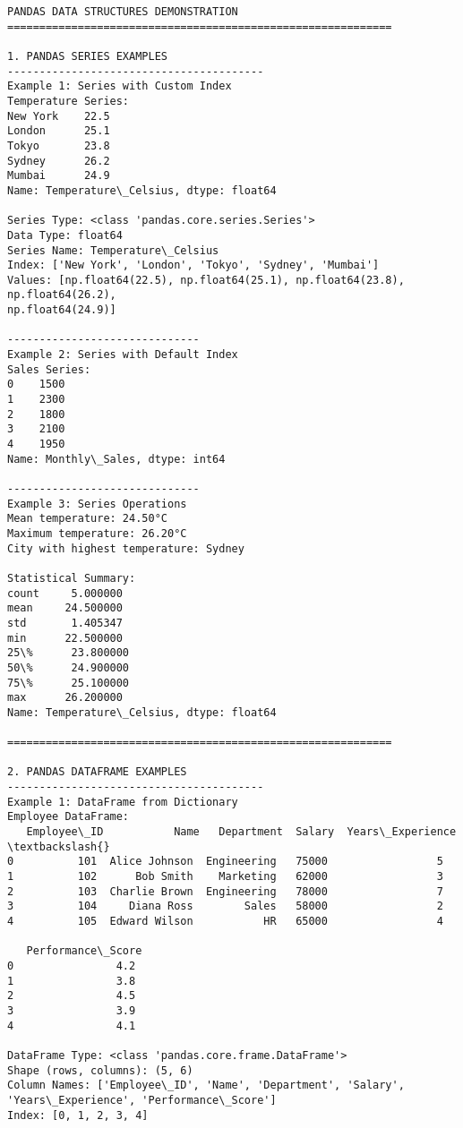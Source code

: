 \documentclass[11pt]{article}
\begin{document}
    \begin{Verbatim}[commandchars=\\\{\}]
PANDAS DATA STRUCTURES DEMONSTRATION
============================================================

1. PANDAS SERIES EXAMPLES
----------------------------------------
Example 1: Series with Custom Index
Temperature Series:
New York    22.5
London      25.1
Tokyo       23.8
Sydney      26.2
Mumbai      24.9
Name: Temperature\_Celsius, dtype: float64

Series Type: <class 'pandas.core.series.Series'>
Data Type: float64
Series Name: Temperature\_Celsius
Index: ['New York', 'London', 'Tokyo', 'Sydney', 'Mumbai']
Values: [np.float64(22.5), np.float64(25.1), np.float64(23.8), np.float64(26.2),
np.float64(24.9)]

------------------------------
Example 2: Series with Default Index
Sales Series:
0    1500
1    2300
2    1800
3    2100
4    1950
Name: Monthly\_Sales, dtype: int64

------------------------------
Example 3: Series Operations
Mean temperature: 24.50°C
Maximum temperature: 26.20°C
City with highest temperature: Sydney

Statistical Summary:
count     5.000000
mean     24.500000
std       1.405347
min      22.500000
25\%      23.800000
50\%      24.900000
75\%      25.100000
max      26.200000
Name: Temperature\_Celsius, dtype: float64

============================================================

2. PANDAS DATAFRAME EXAMPLES
----------------------------------------
Example 1: DataFrame from Dictionary
Employee DataFrame:
   Employee\_ID           Name   Department  Salary  Years\_Experience  \textbackslash{}
0          101  Alice Johnson  Engineering   75000                 5
1          102      Bob Smith    Marketing   62000                 3
2          103  Charlie Brown  Engineering   78000                 7
3          104     Diana Ross        Sales   58000                 2
4          105  Edward Wilson           HR   65000                 4

   Performance\_Score
0                4.2
1                3.8
2                4.5
3                3.9
4                4.1

DataFrame Type: <class 'pandas.core.frame.DataFrame'>
Shape (rows, columns): (5, 6)
Column Names: ['Employee\_ID', 'Name', 'Department', 'Salary',
'Years\_Experience', 'Performance\_Score']
Index: [0, 1, 2, 3, 4]


\end{Verbatim}
\end{document}
